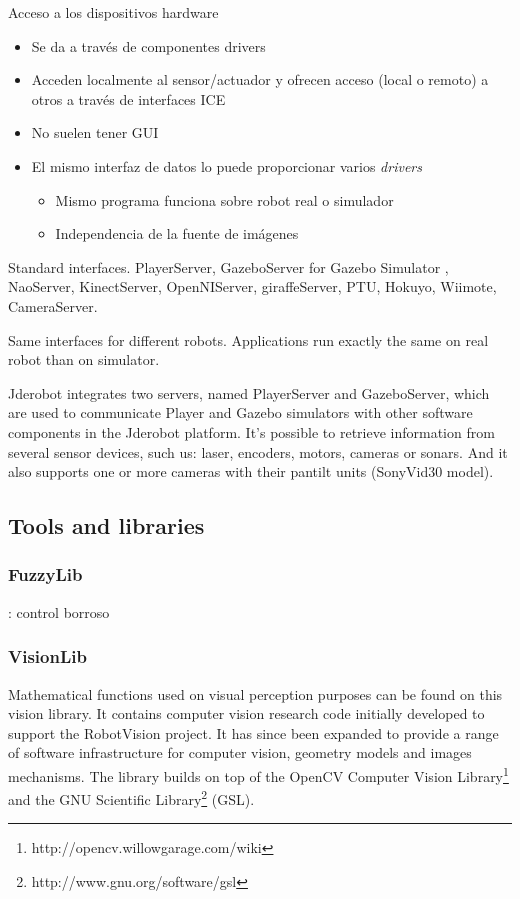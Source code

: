 \documentclass[twocolumn]{svjour3}          %
\begin{document}
Acceso a los dispositivos hardware
\begin{itemize}
\item Se da a través de {componentes drivers}
\item Acceden localmente al sensor/actuador y ofrecen acceso (local o remoto) a otros a través de interfaces ICE
\item No suelen tener GUI
\item El mismo interfaz de datos lo puede proporcionar varios \textit{drivers}
\begin{itemize}
\item Mismo programa funciona sobre robot real o simulador
\item Independencia de la fuente de imágenes
\end{itemize}
\end{itemize}


Standard interfaces. 
PlayerServer, GazeboServer for Gazebo Simulator \cite{koening2004}, NaoServer, KinectServer, OpenNIServer, giraffeServer, PTU, Hokuyo, Wiimote, CameraServer.

Same interfaces for different robots.
Applications run exactly the same on real robot than on simulator. 

Jderobot integrates two servers, named PlayerServer and GazeboServer, which are used to communicate Player and Gazebo simulators with other software components in the Jderobot platform. It's possible to retrieve information from several sensor devices, such us: laser, encoders, motors, cameras or sonars. And it also supports one or more cameras with their pantilt units (SonyVid30 model).

\subsection{Tools and libraries}

\subsubsection{FuzzyLib}: control borroso
\subsubsection{VisionLib}

Mathematical functions used on visual perception purposes can be found on this vision library. It contains computer vision research code initially developed to support the RobotVision project. It has since been expanded to provide a range of software infrastructure for computer vision, geometry models and images mechanisms. The library builds on top of the OpenCV Computer Vision Library\footnote{http://opencv.willowgarage.com/wiki} and the GNU Scientific Library\footnote{http://www.gnu.org/software/gsl} (GSL).
\end{document}
